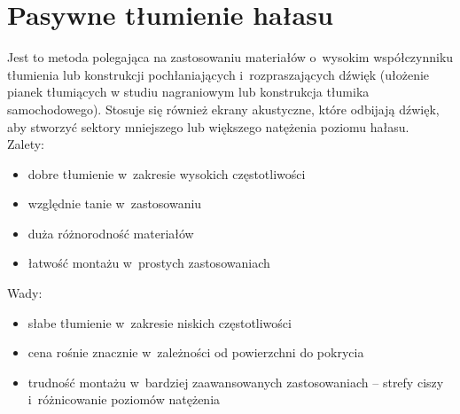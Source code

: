 \section{Pasywne tłumienie hałasu}
\label{sec:PNC}
Jest to metoda polegająca na zastosowaniu materiałów o~wysokim współczynniku tłumienia lub konstrukcji pochłaniających i~rozpraszających dźwięk (ułożenie pianek tłumiących w studiu nagraniowym lub konstrukcja tłumika samochodowego). Stosuje się również ekrany akustyczne, które odbijają dźwięk, aby stworzyć sektory mniejszego lub większego natężenia poziomu hałasu.\\
Zalety:
\begin{itemize}
	\item dobre tłumienie w~zakresie wysokich częstotliwości
	\item względnie tanie w~zastosowaniu
	\item duża różnorodność materiałów
	\item łatwość montażu w~prostych zastosowaniach
\end{itemize}
Wady:
\begin{itemize}
	\item słabe tłumienie w~zakresie niskich częstotliwości
	\item cena rośnie znacznie w~zależności od powierzchni do pokrycia
	\item trudność montażu w~bardziej zaawansowanych zastosowaniach -- strefy ciszy i~różnicowanie poziomów natężenia
\end{itemize}


